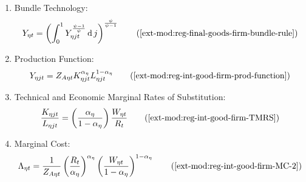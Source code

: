 \documentclass[../thesis.tex]{subfiles}
\begin{document}
{\begin{itemize}
\begin{enumerate}
\begin{comment}
		\end{comment}
		
		\item Bundle Technology:
		\begin{align}
			Y_{\eta t} = \left( \int_{0}^{1} Y_{\eta jt}^{\frac{\psi-1}{\psi}} \dif j \right)^{\frac{\psi}{\psi-1}} \tag{\ref{ext-mod:reg-final-goods-firm-bundle-rule}}
		\end{align}
		
		\item Production Function:
		\begin{align}
			Y_{\eta jt} = Z_{A\eta t} K_{\eta jt}^{\alpha_{\eta}} L_{\eta jt}^{1-{\alpha_{\eta}}} 
			\tag{\ref{ext-mod:reg-int-good-firm-prod-function}}
		\end{align}

		\item Technical and Economic Marginal Rates of Substitution:
		\begin{align}
			\frac{K_{\eta jt}}{L_{\eta jt}} = \left( \frac{{\alpha_{\eta}}}{1-\alpha_{\eta}} \right) \frac{W_{\eta t}}{R_{t}} \tag{\ref{ext-mod:reg-int-good-firm-TMRS}}
		\end{align}

\begin{comment}
	\item Capital Demand: 
	\begin{align}
		K_{\eta jt} & = \frac{Y_{\eta jt}}{Z_{A\eta t}} \left[ \left( \frac{{\alpha_{\eta}}}{1-\alpha_{\eta}} \right) \frac{W_{\eta t}}{R_{t}}\right]^{1-\alpha_{\eta}} \tag{\ref{ext-mod:reg-int-good-firm-Kt-demand}}
	\end{align}
	
	\item Labor Demand:
	\begin{align}
		L_{\eta jt} & = \frac{Y_{\eta jt}}{Z_{A\eta t}} \left[ \left( \frac{{\alpha_{\eta}}}{1-\alpha_{\eta}} \right) \frac{W_{\eta t}}{R_{t}}\right]^{-{\alpha_{\eta}}} \tag{\ref{ext-mod:reg-int-good-firm-Lt-demand}}
	\end{align}
\end{comment}

		\item Marginal Cost:
		\begin{align}
			\Lambda_{\eta t} = \frac{1}{Z_{A\eta t}} \left( \frac{R_{t}}{{\alpha_{\eta}}} \right)^{{\alpha_{\eta}}} \left( \frac{W_{\eta t}}{1-\alpha_{\eta}} \right)^{1-\alpha_{\eta}} \tag{\ref{ext-mod:reg-int-good-firm-MC-2}}
		\end{align}


\end{enumerate}
\end{itemize}}
\end{document}
